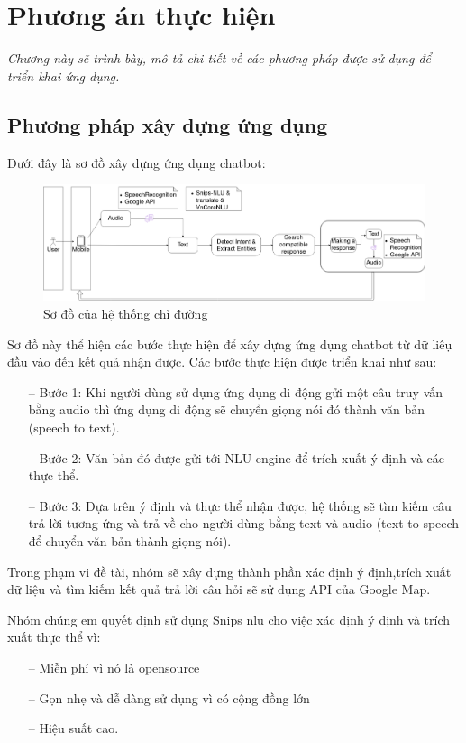 \chapter{Phương án thực hiện}
\label{Chapter4}

\emph{Chương này sẽ trình bày, mô tả chi tiết về các phương pháp được sử dụng để triển khai ứng dụng.}


\section{Phương pháp xây dựng ứng dụng}
Dưới đây là sơ đồ xây dựng ứng dụng chatbot:
\begin{figure}[htp]
    \centering
    \includegraphics[width=15cm]{images/Structure-description.png}
    \caption{Sơ đồ của hệ thống chỉ đường}
    \label{fig:sodohethongchiduong}

\end{figure}

Sơ đồ này thể hiện các bước thực hiện để xây dựng ứng dụng chatbot từ dữ liêụ đầu vào đến kết quả nhận được. Các bước thực hiện được triển khai như sau:
\begin{itemize}
    \item[--] Bước 1: Khi người dùng sử dụng ứng dụng di động gửi một câu truy vấn bằng audio thì ứng dụng di động sẽ chuyển giọng nói đó thành văn bản (speech to text).
    \item[--] Bước 2: Văn bản đó được gửi tới NLU engine để trích xuất ý định và các thực thể.
    \item[--] Bước 3: Dựa trên ý định và thực thể nhận được, hệ thống sẽ tìm kiếm câu trả lời tương ứng và trả về cho người dùng bằng text và audio (text to speech để chuyển văn bản thành giọng nói).
\end{itemize}
Trong phạm vi đề tài, nhóm sẽ xây dựng thành phần xác định ý định,trích xuất dữ liệu và tìm kiếm kết quả trả lời câu hỏi sẽ sử dụng API của Google Map.

Nhóm chúng em quyết định sử dụng Snips \ac{nlu} cho việc xác định ý định và trích xuất thực thể vì:
\begin{itemize}
    \item[--] Miễn phí vì nó là opensource
    \item[--] Gọn nhẹ và dễ dàng sử dụng vì có cộng đồng lớn
    \item[--] Hiệu suất cao.
\end{itemize}

